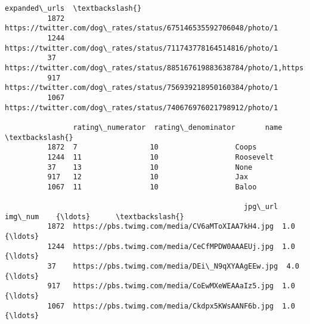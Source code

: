 \documentclass[11pt]{article}
\begin{document}
\begin{Verbatim}[commandchars=\\\{\}]
                                                                                                                                                                                                                                                                  expanded\_urls  \textbackslash{}
          1872  https://twitter.com/dog\_rates/status/675146535592706048/photo/1                                                                                                                                                                                                   
          1244  https://twitter.com/dog\_rates/status/711743778164514816/photo/1                                                                                                                                                                                                   
          37    https://twitter.com/dog\_rates/status/885167619883638784/photo/1,https://twitter.com/dog\_rates/status/885167619883638784/photo/1,https://twitter.com/dog\_rates/status/885167619883638784/photo/1,https://twitter.com/dog\_rates/status/885167619883638784/photo/1   
          917   https://twitter.com/dog\_rates/status/756939218950160384/photo/1                                                                                                                                                                                                   
          1067  https://twitter.com/dog\_rates/status/740676976021798912/photo/1                                                                                                                                                                                                   
          
                rating\_numerator  rating\_denominator       name  \textbackslash{}
          1872  7                 10                  Coops       
          1244  11                10                  Roosevelt   
          37    13                10                  None        
          917   12                10                  Jax         
          1067  11                10                  Baloo       
          
                                                        jpg\_url  img\_num    {\ldots}      \textbackslash{}
          1872  https://pbs.twimg.com/media/CV6aMToXIAA7kH4.jpg  1.0        {\ldots}       
          1244  https://pbs.twimg.com/media/CeCfMPDW0AAAEUj.jpg  1.0        {\ldots}       
          37    https://pbs.twimg.com/media/DEi\_N9qXYAAgEEw.jpg  4.0        {\ldots}       
          917   https://pbs.twimg.com/media/CoEwMXeWEAAaIz5.jpg  1.0        {\ldots}       
          1067  https://pbs.twimg.com/media/Ckdpx5KWsAANF6b.jpg  1.0        {\ldots}       
          

\end{Verbatim}
\end{document}
